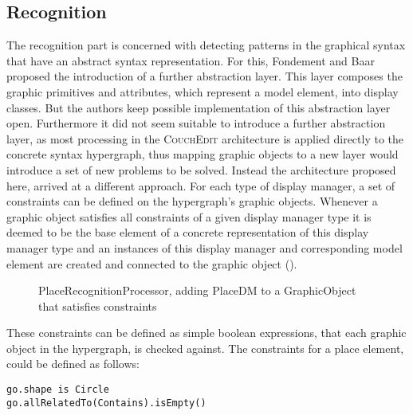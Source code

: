 \subsection{Recognition}
\label{sec:recognition}
The recognition part is concerned with detecting patterns in the graphical syntax that have an abstract syntax representation. For this, Fondement and Baar proposed the introduction of a further abstraction layer. This layer composes the graphic primitives and attributes, which represent a model element, into display classes. But the authors keep possible implementation of this abstraction layer open. Furthermore it did not seem suitable to introduce a further abstraction layer, as most processing in the \textsc{CouchEdit} architecture is applied directly to the concrete syntax hypergraph, thus mapping graphic objects to a new layer would introduce a set of new problems to be solved. Instead the architecture proposed here, arrived at a different approach. For each type of display manager, a set of constraints can be defined on the hypergraph's graphic objects. Whenever a graphic object satisfies all constraints of a given display manager type it is deemed to be the base element of a concrete representation of this display manager type and an instances of this display manager and corresponding model element are created and connected to the graphic object ().


\begin{figure}
  \centering
  
  \caption{PlaceRecognitionProcessor, adding PlaceDM to a GraphicObject that satisfies constraints}
  \label{fig:place-recognition}
\end{figure}

These constraints can be defined as simple boolean expressions, that each graphic object in the hypergraph, is checked against. The constraints for a place element, could be defined as follows:

\begin{lstlisting}[language=OCL,caption={Possible constraints to detect GOs representing a place},captionpos=b]
go.shape is Circle
go.allRelatedTo(Contains).isEmpty()
\end{lstlisting}


